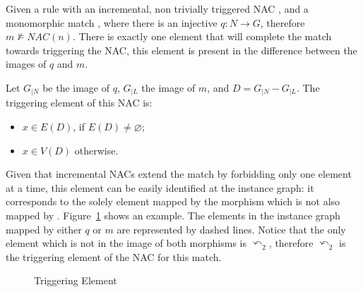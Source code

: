 \begin{definition} Given a rule \graphrule{} with an incremental, non trivially triggered NAC \nac{}, and a monomorphic match \match{}, where there is an injective $q : N \rightarrow G$, therefore $m \not\models NAC(n)$. There is exactly one element that will complete the match towards triggering the NAC, this element is present in the difference between the images of $q$ and $m$.

  Let $G_{|N}$ be the image of $q$, $G_{|L}$ the image of $m$, and \mbox{$D = G_{|N} - G_{|L}$}. The triggering element of this NAC is:

  \begin{itemize}
    \item $x \in E(D)$, if $E(D) \neq \varnothing$;
    \item $x \in V(D)$ otherwise.
  \end{itemize} 
\end{definition}

\begin{example}
  Given that incremental NACs extend the match by forbidding only one element at a time, this element can be easily identified at the instance graph: it corresponds to the solely element mapped by the morphism  which is not also mapped by . Figure~\ref{fig:process:triggering-element} shows an example. The elements in the instance graph mapped by either $q$ or $m$ are represented by dashed lines. Notice that the only element which is not in the image of
  both morphisms is $\curvearrowleft_2$, therefore $\curvearrowleft_2$ is the triggering element of the NAC for this match.
\end{example}

\begin{figure}[!ht]
  \centering
  \caption{Triggering Element}\label{fig:process:triggering-element}
\end{figure}

